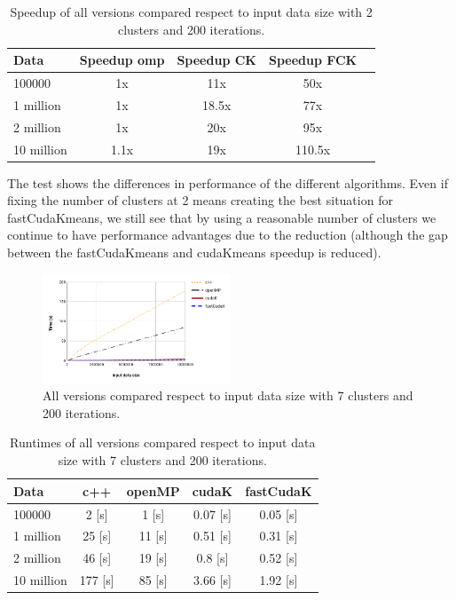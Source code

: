 \documentclass[10pt,twocolumn,letterpaper]{article}
\begin{document}
\begin{table}[H]
\begin{center}
\begin{tabular}{|l|c|c|c|c|}
\hline
Data & Speedup omp & Speedup CK & Speedup FCK\\
\hline\hline
100000 & 1x & 11x & 50x \\
1 million & 1x & 18.5x & 77x \\
2 million & 1x & 20x & 95x \\
10 million & 1.1x & 19x & 110.5x\\
\hline
\end{tabular}
\end{center}
\caption{Speedup of all versions compared respect to input data size with 2 clusters and 200 iterations.}
\end{table}

The test shows the differences in performance of the different algorithms. Even if fixing the number of clusters at 2 means creating the best situation for fastCudaKmeans, we still see that by using a reasonable number of clusters we continue to have performance advantages due to the reduction (although the gap between the fastCudaKmeans and cudaKmeans speedup is reduced).


\begin{figure}[H]
\begin{center}
\includegraphics[width=0.5\textwidth]{latex/2.png}
\caption{All versions compared respect to input data size with 7 clusters and 200 iterations.}
\label{etichetta}
\end{center}
\end{figure}

\begin{table}[H]
\begin{center}
\begin{tabular}{|l|c|c|c|c|}
\hline
Data & c++ & openMP & cudaK & fastCudaK\\
\hline\hline
100000 & 2 [s] & 1 [s] & 0.07 [s] & 0.05 [s]\\
1 million & 25 [s] & 11 [s] & 0.51 [s] & 0.31 [s]\\
2 million & 46 [s] & 19 [s] & 0.8 [s] & 0.52 [s]\\
10 million & 177 [s] & 85 [s] & 3.66 [s] & 1.92 [s]\\
\hline
\end{tabular}
\end{center}
\caption{Runtimes of all versions compared respect to input data size with 7 clusters and 200 iterations.}
\end{table}
\end{document}
